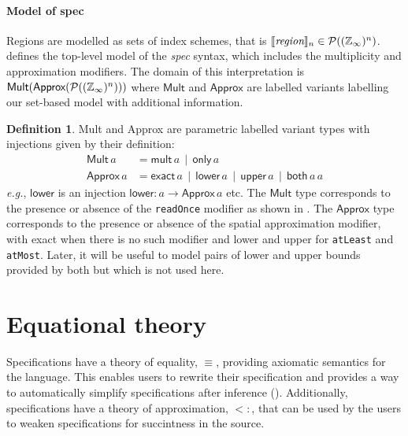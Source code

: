 \documentclass[10pt,preprint,numbers]{sigplanconf}
\newcounter{block}
\theoremstyle{definition}
\newtheorem{definition}[block]{Definition}
\newcommand{\eg}{\emph{e.g.}}
\newcommand{\interp}[1]{\llbracket{#1}\rrbracket}
\newcommand{\term}[1]{\texttt{#1}}
\begin{document}
\paragraph{Model of spec}

Regions are modelled as sets of index
schemes, that is
$\interp{\textit{region}}_n \in \mathcal{P}((\domainVal{})^n)$.
 defines the top-level model of the
\textit{spec} syntax, which includes the multiplicity and
approximation modifiers. The domain of this interpretation
is $\textsf{Mult}(\textsf{Approx}(\mathcal{P}((\mathbb{Z}_\infty{})^n)))$
where $\textsf{Mult}$ and $\textsf{Approx}$ are labelled variants
labelling our set-based model with additional information.

\begin{definition} \textsf{Mult}
and \textsf{Approx} are parametric labelled variant types
with injections given by their definition:
%
\begin{align*}
\textsf{Mult} \, a & = \textsf{mult} \, a \,\mid\, \textsf{only} \, a \\
\textsf{Approx} \, a & = \textsf{exact} \, a \,\mid\, \textsf{lower} \, a \,\mid\,
\textsf{upper} \, a \,\mid\, \textsf{both} \, a \, a
\end{align*}
\eg{}, $\mathsf{lower}$ is an injection
$\mathsf{lower} : a \rightarrow \mathsf{Approx} \, a$ etc. The
$\textsf{Mult}$ type corresponds to the presence or absence of the
\term{readOnce} modifier as shown in .
The $\textsf{Approx}$ type corresponds to the presence or absence of
the spatial approximation modifier, with \textsf{exact} when there is
no such modifier and \textsf{lower} and \textsf{upper} for
\term{atLeast} and \term{atMost}. Later, it will be useful to model
pairs of lower and upper bounds provided by \textsf{both} but which is
not used
here.%
\label{def:mult-and-approx}
\end{definition}

\section{Equational theory}
\label{sec:eqs}

Specifications have a theory of equality, $\equiv$, providing axiomatic
semantics for the language. This enables users to rewrite their specification
and provides a way to automatically simplify
specifications after inference ().
Additionally, specifications have a theory of approximation,
$<:$, that can be used by the users to weaken specifications for succintness in
the source.
\end{document}
